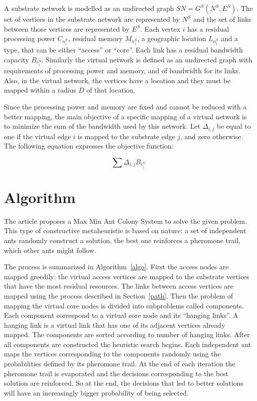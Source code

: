 \documentclass[10pt, a4paper, twocolumn]{article}
\begin{document}
A substrate network is modelled as an undirected graph $SN = G^{S}(N^{S}, E^{S})$. The set of vertices in the substrate network are represented by $N^{S}$ and the set of links between those vertices are represented by $E^{S}$. Each vertex $i$ has a residual processing power $C_{n^{S}_{i}}$, residual memory $M_{n^{S}_{i}}$, a geographic location $L_{n^{S}_{i}}$ and a type, that can be either ``access'' or ``core''. Each link has a residual bandwidth capacity $B_{e^{S}_{i}}$. Similarly the virtual network is defined as an undirected graph with requirements of processing power and memory, and of bandwidth for its links. Also, in the virtual network, the vertices have a location and they must be mapped within a radius $D$ of that location.

Since the processing power and memory are fixed and cannot be reduced with a better mapping, the main objective of a specific mapping of a virtual network is to minimize the sum of the bandwidth used by this network. Let $\Delta_{i,j}$ be equal to one if the virtual edge $i$ is mapped to the substrate edge $j$, and zero otherwise. The following equation expresses the objective function:

\begin{equation}
  \sum \Delta_{i,j} B_{e^{V}_{i}} \label{eq:objfun}
\end{equation}


\section{Algorithm}
The article proposes a Max Min Ant Colony System to solve the given problem. This type of constructive metaheuristic is based on nature: a set of independent ants randomly construct a solution, the best one reinforces a pheromone trail, which other ants might follow.

The process is summarized in Algorithm~\ref{algo}. First the access nodes are mapped greedily: the virtual access vertices are mapped to the substrate vertices that have the most residual resources. The links between access vertices are mapped using the process described in Section~\ref{path}. Then the problem of mapping the virtual core nodes is divided into subproblems called components. Each component correspond to a virtual core node and its ``hanging links''. A hanging link is a virtual link that has one of its adjacent vertices already mapped. The components are sorted according to number of hanging links. After all components are constructed the heuristic search begins. Each independent ant maps the vertices corresponding to the components randomly using the probabilities defined by its pheromone trail. At the end of each iteration the pheromone trail is evaporated and the decisions corresponding to the best solution are reinforced. So at the end, the decisions that led to better solutions will have an increasingly bigger probability of being selected.
\end{document}
